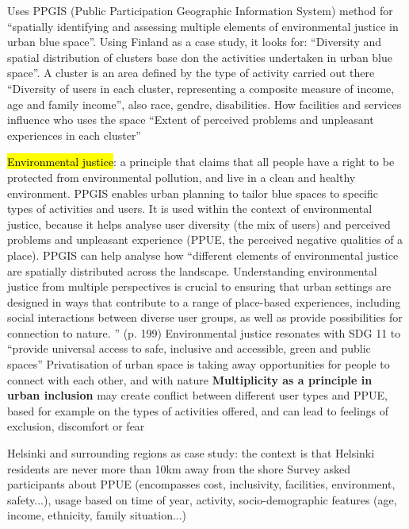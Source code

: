 \documentclass{article}
\newcommand{\alignedmarginpar}[1]{%
        \marginpar{\raggedright\small #1}
    }
\begin{document}
\begin{outline}
	\1 Uses PPGIS (Public Participation Geographic Information System) method for ``spatially identifying and assessing multiple elements of environmental justice in urban blue space''. Using Finland as a case study, it looks for:
		\2 ``Diversity and spatial distribution of clusters base don the activities undertaken in urban blue space''. A cluster is an area defined by the type of activity carried out there
		\2 ``Diversity of users in each cluster, representing a composite measure of income, age and family income'', also race, gendre, disabilities. How facilities and services influence who uses the space
		\2 ``Extent of perceived problems and unpleasant experiences in each cluster'' 

	\1 \hl{Environmental justice}: a principle that claims that all people have a right to be protected from environmental pollution, and live in a clean and healthy environment. 
		\2  PPGIS enables urban planning to tailor blue spaces to specific types of activities and users. It is used within the context of environmental justice, because it helps analyse user diversity (the mix of users) and perceived problems and unpleasant experience (PPUE, the perceived negative qualities of a place). PPGIS can help analyse how ``different elements of environmental justice are spatially distributed across the landscape. Understanding environmental justice from multiple perspectives is crucial to ensuring that urban settings are designed in ways that contribute to a range of place-based experiences, including social interactions between diverse user groups, as well as provide possibilities for connection to nature. '' (p. 199)
		\2 Environmental justice resonates with SDG 11 to ``provide universal access to safe, inclusive and accessible, green and public spaces''
		\2 Privatisation of urban space is taking away opportunities for people to connect with each other, and with nature
		\2 \textbf{Multiplicity as a principle in urban inclusion} may create conflict between different user types and PPUE, based for example on the types of activities offered, and can lead to feelings of exclusion, discomfort or fear\alignedmarginpar{Inclusivity in public space\\Right to blue space}
	\1 Helsinki and surrounding regions as case study: the context is that Helsinki residents are never more than 10km away from the shore
		\2 Survey asked participants about PPUE (encompasses cost, inclusivity, facilities, environment, safety...), usage based on time of year, activity, socio-demographic features (age, income, ethnicity, family situation...)

\end{outline}
\end{document}
